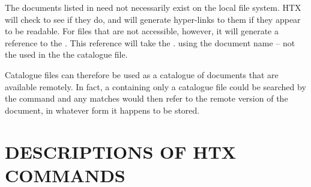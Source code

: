 \documentclass[11pt,nolof]{starlink}
\providecommand{\findmeref}[1]{\htmlref{#1}{findme}}
\providecommand{\hi}[1]{{\texttt{#1}}}
\begin{document}
The documents listed in   need not necessarily exist on the local
file system. HTX will check to see if they do, and will generate
hyper-links to them if they appear to be readable. For files that are
not accessible, however, it will generate a reference to the
.
This reference will
take the 
\latex{(\S\ref{sect:specifyingaserver})}.
using the document name -- not the  used in the the catalogue file.

Catalogue files can therefore be used as a
 catalogue of
documents that are available remotely. In fact, a  containing only a catalogue file
could be searched by the \findmeref{\hi{findme}} command and any
matches would then refer to the remote version of the document, in
whatever form it happens to be stored.

\newpage
\appendix
\section{\label{sect:commanddescriptions}DESCRIPTIONS OF HTX COMMANDS}
\end{document}
